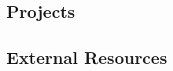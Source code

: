 \documentclass[12pt,letterpaper]{book}
\theoremstyle{definition}
\begin{document}
\begin{preview}
\part{Projects}
\end{preview}
\renewcommand{\chaptername}{Projects}
\titleformat{\section}{\normalfont\Large\bfseries}{\thesection}{1em}{}
\begin{preview}

\end{preview}
\begin{preview}

\end{preview}

\begin{preview}
\part{External Resources}
\end{preview}
\renewcommand{\chaptername}{External Resource}
\lstset{xleftmargin=.05\textwidth, xrightmargin=0.01\textwidth}
\begin{preview}

\end{preview}

\begin{preview}
\printbibliography
\end{preview}
\end{document}
